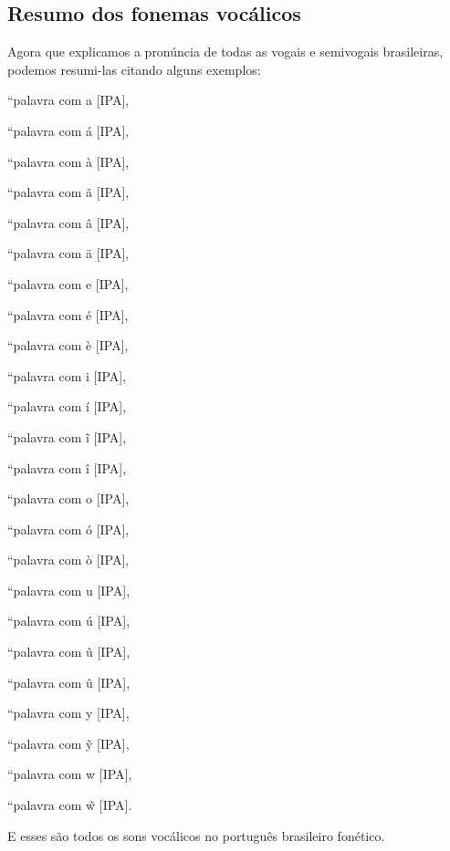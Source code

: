 \documentclass[12pt, a5paper, titlepage]{article}
\begin{document}
\subsection{Resumo dos fonemas vocálicos}
Agora que explicamos a pronúncia de todas as vogais e semivogais brasileiras, podemos resumi-las citando alguns exemplos:
\newline
\par [não precisa de 1 exemplo por fonema vocálico]
\par ``palavra com a [IPA],
\par ``palavra com á [IPA],
\par ``palavra com à [IPA],
\par ``palavra com ã [IPA],
\par ``palavra com â [IPA],
\par ``palavra com ä [IPA],
\par ``palavra com e [IPA],
\par ``palavra com é [IPA],
\par ``palavra com è [IPA],
\par ``palavra com i [IPA],
\par ``palavra com í [IPA],
\par ``palavra com ĩ [IPA],
\par ``palavra com î [IPA],
\par ``palavra com o [IPA],
\par ``palavra com ó [IPA],
\par ``palavra com ò [IPA],
\par ``palavra com u [IPA],
\par ``palavra com ú [IPA],
\par ``palavra com ũ [IPA],
\par ``palavra com û [IPA],
\par ``palavra com y [IPA],
\par ``palavra com \~y [IPA],
\par ``palavra com w [IPA],
\par ``palavra com \~w [IPA].
\newline

E esses são todos os sons vocálicos no português brasileiro fonético.


\end{document}
